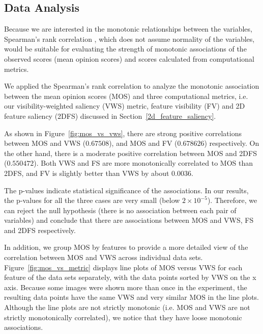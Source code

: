 \subsection{Data Analysis}
Because we are interested in the monotonic relationships between the variables, Spearman's rank correlation \cite{cunningham_experimental_2011}, which does not assume normality of the variables, would be suitable for evaluating the strength of monotonic associations of the observed scores (mean opinion scores) and scores calculated from computational metrics. 

We applied the Spearman's rank correlation to analyze the monotonic association between the mean opinion scores (MOS) and three computational metrics, i.e. our visibility-weighted saliency (VWS) metric, feature visibility (FV) \cite{wang_efficient_2011} and 2D feature saliency (2DFS) discussed in Section~\ref{2d_feature_saliency}.

As shown in Figure~\ref{fig:mos_vs_vws}, there are strong positive correlations between MOS and VWS ($ 0.67508 $), and MOS and FV ($ 0.678626 $) respectively. On the other hand, there is a moderate positive correlation between MOS and 2DFS ($ 0.550472 $). Both VWS and FS are more monotonically correlated to MOS than 2DFS, and FV is slightly better than VWS by about $ 0.0036 $.

The p-values indicate statistical significance of the associations. In our results, the p-values for all the three cases are very small (below $2 \times 10^{-5} $). Therefore, we can reject the null hypothesis (there is no association between each pair of variables) and conclude that there are associations between MOS and VWS, FS and 2DFS respectively.

In addition, we group MOS by features to provide a more detailed view of the correlation between MOS and VWS across individual data sets.
Figure~\ref{fig:mos_vs_metric} displays line plots of MOS versus VWS for each feature of the data sets separately, with the data points sorted by VWS on the x axis.
Because some images were shown more than once in the experiment, the resulting data points have the same VWS and very similar MOS in the line plots.
Although the line plots are not strictly monotonic (i.e. MOS and VWS are not strictly monotonically correlated), we notice that they have loose monotonic associations.

